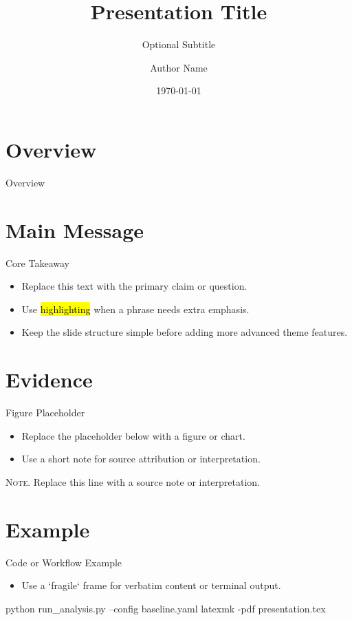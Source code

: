 \documentclass[red]{beamer}
\title[Short Title]{Presentation Title}
\subtitle{Optional Subtitle}
\author{Author Name}
\institute{Institution Name}
\date{\today}
\begin{document}
\begin{frame}[plain]
    \titlepage
\end{frame}

\section{Overview}
\begin{frame}{Overview}
    \tableofcontents
\end{frame}

\section{Main Message}
\begin{frame}{Core Takeaway}
    \begin{itemize}
        \item Replace this text with the primary claim or question.
        \item Use \hl{highlighting} when a phrase needs extra emphasis.
        \item Keep the slide structure simple before adding more advanced theme features.
    \end{itemize}
\end{frame}

\section{Evidence}
\begin{frame}{Figure Placeholder}
    \begin{itemize}
        \item Replace the placeholder below with a figure or chart.
        \item Use a short note for source attribution or interpretation.
    \end{itemize}
    \begin{center}
    \end{center}
    \footnotesize{\textsc{Note}. Replace this line with a source note or interpretation.}
\end{frame}

\section{Example}
\begin{frame}[fragile]{Code or Workflow Example}
    \begin{itemize}
        \item Use a `fragile` frame for verbatim content or terminal output.
    \end{itemize}
    \begin{jVerb}
python run_analysis.py --config baseline.yaml
latexmk -pdf presentation.tex
    \end{jVerb}
\end{frame}
\end{document}
